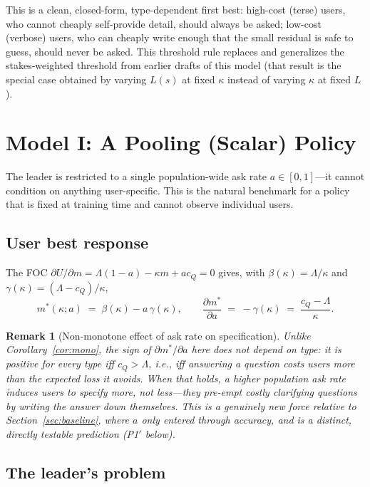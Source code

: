 \documentclass[11pt]{article}
\newtheorem{remark}{Remark}
\begin{document}
This is a clean, closed-form, type-dependent first best: high-cost (terse) users,
who cannot cheaply self-provide detail, should always be asked; low-cost (verbose)
users, who can cheaply write enough that the small residual is safe to guess,
should never be asked. This threshold rule replaces and generalizes the
stakes-weighted threshold from earlier drafts of this model (that result is the
special case obtained by varying $L(s)$ at fixed $\kappa$ instead of varying
$\kappa$ at fixed $L$).

\section{Model I: A Pooling (Scalar) Policy}
\label{sec:model1}

The leader is restricted to a single population-wide ask rate $a\in[0,1]$---it
cannot condition on anything user-specific. This is the natural benchmark for a
policy that is fixed at training time and cannot observe individual users.

\subsection{User best response}

The FOC $\partial U/\partial m = \Lambda(1-a) - \kappa m + ac_Q = 0$ gives, with
$\beta(\kappa)=\Lambda/\kappa$ and $\gamma(\kappa)=(\Lambda-c_Q)/\kappa$,
\[
m^*(\kappa;a) \;=\; \beta(\kappa) - a\,\gamma(\kappa), \qquad
\frac{\partial m^*}{\partial a} \;=\; -\gamma(\kappa) \;=\; \frac{c_Q-\Lambda}{\kappa}.
\]

\begin{remark}[Non-monotone effect of ask rate on specification]
Unlike Corollary~\ref{cor:mono}, the sign of $\partial m^*/\partial a$ here does
not depend on type: it is positive for \emph{every} type iff $c_Q > \Lambda$, i.e.,
iff answering a question costs users more than the expected loss it avoids. When
that holds, a higher population ask rate induces users to specify \emph{more}, not
less---they pre-empt costly clarifying questions by writing the answer down
themselves. This is a genuinely new force relative to Section~\ref{sec:baseline},
where $a$ only entered through accuracy, and is a distinct, directly testable
prediction (P1$'$ below).
\end{remark}

\subsection{The leader's problem}
\end{document}
